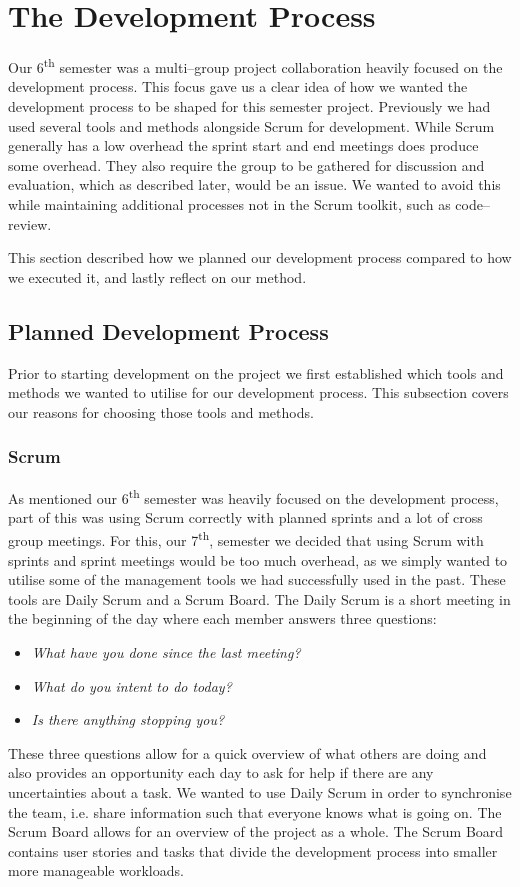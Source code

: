 \section{The Development Process}
Our 6\textsuperscript{th} semester was a multi--group project collaboration heavily focused on the development process.
This focus gave us a clear idea of how we wanted the development process to be shaped for this semester project.
Previously we had used several tools and methods alongside Scrum for development.
While Scrum generally has a low overhead the sprint start and end meetings does produce some overhead.
They also require the group to be gathered for discussion and evaluation, which as described later, would be an issue.
We wanted to avoid this while maintaining additional processes not in the Scrum toolkit, such as code--review.

This section described how we planned our development process compared to how we executed it, and lastly reflect on our method.
\subsection{Planned Development Process}
Prior to starting development on the project we first established which tools and methods we wanted to utilise for our development process.
This subsection covers our reasons for choosing those tools and methods.
\subsubsection{Scrum}
As mentioned our 6\textsuperscript{th} semester was heavily focused on the development process, part of this was using Scrum correctly with planned sprints and a lot of cross group meetings.
For this, our 7\textsuperscript{th}, semester we decided that using Scrum with sprints and sprint meetings would be too much overhead, as we simply wanted to utilise some of the management tools we had successfully used in the past.
These tools are Daily Scrum and a Scrum Board.
The Daily Scrum is a short meeting in the beginning of the day where each member answers three questions:
\begin{itemize}
    \item \textit{What have you done since the last meeting?}
    \item \textit{What do you intent to do today?}
    \item \textit{Is there anything stopping you?}
\end{itemize}
These three questions allow for a quick overview of what others are doing and also provides an opportunity each day to ask for help if there are any uncertainties about a task.
We wanted to use Daily Scrum in order to synchronise the team, i.e. share information such that everyone knows what is going on.
The Scrum Board allows for an overview of the project as a whole.
The Scrum Board contains user stories and tasks that divide the development process into smaller more manageable workloads.
